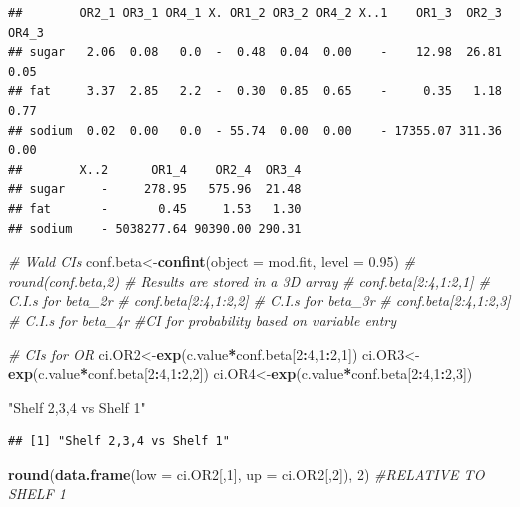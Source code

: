 \documentclass[11pt,]{article}
\newenvironment{Shaded}{\begin{snugshade}}{\end{snugshade}}
\newcommand{\KeywordTok}[1]{\textcolor[rgb]{0.13,0.29,0.53}{\textbf{#1}}}
\newcommand{\DataTypeTok}[1]{\textcolor[rgb]{0.13,0.29,0.53}{#1}}
\newcommand{\DecValTok}[1]{\textcolor[rgb]{0.00,0.00,0.81}{#1}}
\newcommand{\FloatTok}[1]{\textcolor[rgb]{0.00,0.00,0.81}{#1}}
\newcommand{\StringTok}[1]{\textcolor[rgb]{0.31,0.60,0.02}{#1}}
\newcommand{\CommentTok}[1]{\textcolor[rgb]{0.56,0.35,0.01}{\textit{#1}}}
\newcommand{\OperatorTok}[1]{\textcolor[rgb]{0.81,0.36,0.00}{\textbf{#1}}}
\newcommand{\NormalTok}[1]{#1}
\begin{document}
\begin{verbatim}
##        OR2_1 OR3_1 OR4_1 X. OR1_2 OR3_2 OR4_2 X..1    OR1_3  OR2_3 OR4_3
## sugar   2.06  0.08   0.0  -  0.48  0.04  0.00    -    12.98  26.81  0.05
## fat     3.37  2.85   2.2  -  0.30  0.85  0.65    -     0.35   1.18  0.77
## sodium  0.02  0.00   0.0  - 55.74  0.00  0.00    - 17355.07 311.36  0.00
##        X..2      OR1_4    OR2_4  OR3_4
## sugar     -     278.95   575.96  21.48
## fat       -       0.45     1.53   1.30
## sodium    - 5038277.64 90390.00 290.31
\end{verbatim}

\begin{Shaded}
\begin{Highlighting}[]
\CommentTok{# Wald CIs}
\NormalTok{conf.beta<-}\KeywordTok{confint}\NormalTok{(}\DataTypeTok{object =}\NormalTok{ mod.fit, }\DataTypeTok{level =} \FloatTok{0.95}\NormalTok{)}
\CommentTok{# round(conf.beta,2)  # Results are stored in a 3D array}
\CommentTok{# conf.beta[2:4,1:2,1]  # C.I.s for beta_2r}
\CommentTok{# conf.beta[2:4,1:2,2]  # C.I.s for beta_3r}
\CommentTok{# conf.beta[2:4,1:2,3]  # C.I.s for beta_4r}
\CommentTok{#CI for probability based on variable entry}

\CommentTok{# CIs for OR}
\NormalTok{ci.OR2<-}\KeywordTok{exp}\NormalTok{(c.value}\OperatorTok{*}\NormalTok{conf.beta[}\DecValTok{2}\OperatorTok{:}\DecValTok{4}\NormalTok{,}\DecValTok{1}\OperatorTok{:}\DecValTok{2}\NormalTok{,}\DecValTok{1}\NormalTok{])}
\NormalTok{ci.OR3<-}\KeywordTok{exp}\NormalTok{(c.value}\OperatorTok{*}\NormalTok{conf.beta[}\DecValTok{2}\OperatorTok{:}\DecValTok{4}\NormalTok{,}\DecValTok{1}\OperatorTok{:}\DecValTok{2}\NormalTok{,}\DecValTok{2}\NormalTok{])  }
\NormalTok{ci.OR4<-}\KeywordTok{exp}\NormalTok{(c.value}\OperatorTok{*}\NormalTok{conf.beta[}\DecValTok{2}\OperatorTok{:}\DecValTok{4}\NormalTok{,}\DecValTok{1}\OperatorTok{:}\DecValTok{2}\NormalTok{,}\DecValTok{3}\NormalTok{]) }

\StringTok{"Shelf 2,3,4 vs Shelf 1"}
\end{Highlighting}
\end{Shaded}

\begin{verbatim}
## [1] "Shelf 2,3,4 vs Shelf 1"
\end{verbatim}

\begin{Shaded}
\begin{Highlighting}[]
\KeywordTok{round}\NormalTok{(}\KeywordTok{data.frame}\NormalTok{(}\DataTypeTok{low =}\NormalTok{ ci.OR2[,}\DecValTok{1}\NormalTok{], }\DataTypeTok{up =}\NormalTok{ ci.OR2[,}\DecValTok{2}\NormalTok{]), }\DecValTok{2}\NormalTok{) }\CommentTok{#RELATIVE TO SHELF 1}
\end{Highlighting}
\end{Shaded}
\end{document}
